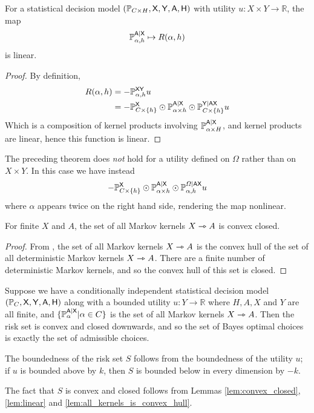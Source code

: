 \begin{lemma}\label{lem:linear}
For a statistical decision model $(\mathbb{P}_{C\times H}, \mathsf{X},\mathsf{Y},\mathsf{A},\mathsf{H})$ with utility $u:X\times Y\to \mathbb{R}$, the map
\begin{align}
    \mathbb{P}_{\alpha,h}^{\mathsf{A}|\mathsf{X}}\mapsto R(\alpha,h)
\end{align}
is linear.
\end{lemma}

\begin{proof}
By definition,
\begin{align}
    R(\alpha,h) &= - \mathbb{P}_{\alpha,h}^{\mathsf{XY}} u\\
    &= -\mathbb{P}_{C\times\{h\}}^{\mathsf{X}} \odot \mathbb{P}_{\alpha\times h}^{\mathsf{A}|\mathsf{X}} \odot \mathbb{P}_{C\times\{h\}}^{\mathsf{Y}|\mathsf{AX}} u
\end{align}
Which is a composition of kernel products involving $\mathbb{P}_{\alpha\times H}^{\mathsf{A}|\mathsf{X}}$, and kernel products are linear, hence this function is linear.
\end{proof}

The preceding theorem does \emph{not} hold for a utility defined on $\Omega$ rather than on $X\times Y$. In this case we have instead
\begin{align}
    -\mathbb{P}_{C\times\{h\}}^{\mathsf{X}} \odot \mathbb{P}_{\alpha\times h}^{\mathsf{A}|\mathsf{X}} \odot \mathbb{P}_{\alpha,h}^{\Omega|\mathsf{AX}} u
\end{align}
where $\alpha$ appears twice on the right hand side, rendering the map nonlinear.

\begin{lemma}\label{lem:all_kernels_is_convex_hull}
For finite $X$ and $A$, the set of all Markov kernels $X\rightarrowtriangle A$ is convex closed.
\end{lemma}

\begin{proof}
From \citet{blackwell_theory_1979}, the set of all Markov kernels $X\rightarrowtriangle A$ is the convex hull of the set of all deterministic Markov kernels $X\rightarrowtriangle A$. There are a finite number of deterministic Markov kernels, and so the convex hull of this set is closed.
\end{proof}

\begin{example}\label{ex:cc_sdt}
Suppose we have a conditionally independent statistical decision model $(\mathbb{P}_{C}, \mathsf{X},\mathsf{Y},\mathsf{A},\mathsf{H})$ along with a bounded utility $u:Y\to \mathbb{R}$ where $H,A,X$ and $Y$ are all finite, and $\{\mathbb{P}_\alpha^{\mathsf{A}|\mathsf{X}}|\alpha\in C\}$ is the set of all Markov kernels $X\rightarrowtriangle A$. Then the risk set is convex and closed downwards, and so the set of Bayes optimal choices is exactly the set of admissible choices.

The boundedness of the risk set $S$ follows from the boundedness of the utility $u$; if $u$ is bounded above by $k$, then $S$ is bounded below in every dimension by $-k$.

The fact that $S$ is convex and closed follows from Lemmas \ref{lem:convex_closed}, \ref{lem:linear} and \ref{lem:all_kernels_is_convex_hull}.
\end{example}

